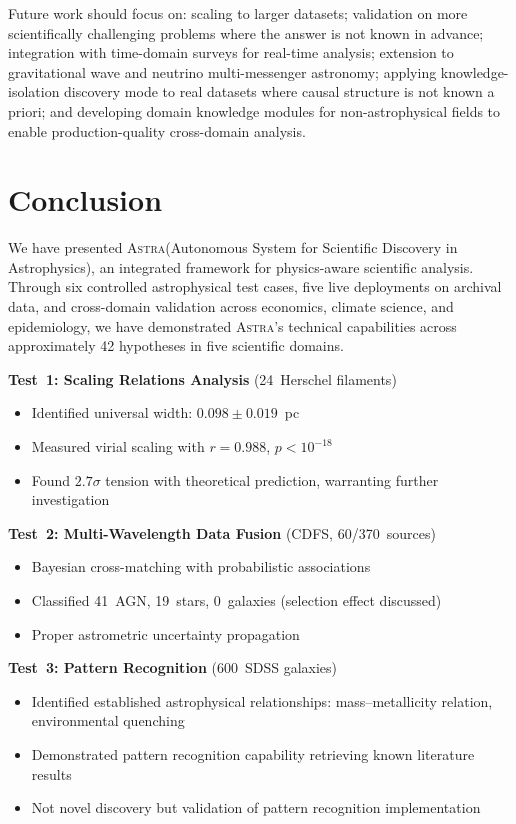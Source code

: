 \documentclass[fleqn,usenatbib]{mnras}
\newcommand{\astra}{\textsc{Astra}\xspace}
\begin{document}
Future work should focus on: scaling to larger datasets; validation on more scientifically challenging problems where the answer is not known in advance; integration with time-domain surveys for real-time analysis; extension to gravitational wave and neutrino multi-messenger astronomy; applying knowledge-isolation discovery mode to real datasets where causal structure is not known a priori; and developing domain knowledge modules for non-astrophysical fields to enable production-quality cross-domain analysis.

\section{Conclusion}
\label{sec:conclusion}

We have presented \astra (Autonomous System for Scientific Discovery in Astrophysics), an integrated framework for physics-aware scientific analysis.
Through six controlled astrophysical test cases, five live deployments on archival data, and cross-domain validation across economics, climate science, and epidemiology, we have demonstrated \astra's technical capabilities across approximately 42 hypotheses in five scientific domains.

\textbf{Test~1: Scaling Relations Analysis} (24~Herschel filaments)
\begin{itemize}
  \item Identified universal width: $0.098 \pm 0.019$~pc
  \item Measured virial scaling with $r = 0.988$, $p < 10^{-18}$
  \item Found $2.7\sigma$ tension with theoretical prediction, warranting further investigation
\end{itemize}

\textbf{Test~2: Multi-Wavelength Data Fusion} (CDFS, 60/370~sources)
\begin{itemize}
  \item Bayesian cross-matching with probabilistic associations
  \item Classified 41~AGN, 19~stars, 0~galaxies (selection effect discussed)
  \item Proper astrometric uncertainty propagation
\end{itemize}

\textbf{Test~3: Pattern Recognition} (600~SDSS galaxies)
\begin{itemize}
  \item Identified established astrophysical relationships: mass--metallicity relation, environmental quenching
  \item Demonstrated pattern recognition capability retrieving known literature results
  \item Not novel discovery but validation of pattern recognition implementation
\end{itemize}
\end{document}
